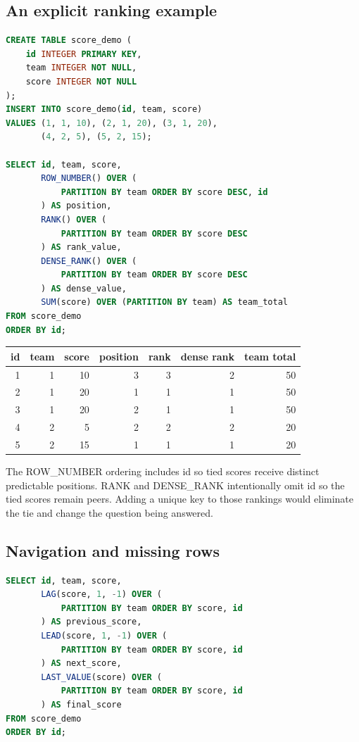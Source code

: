 \subsection{An explicit ranking example}

\begin{lstlisting}[language=SQL]
CREATE TABLE score_demo (
    id INTEGER PRIMARY KEY,
    team INTEGER NOT NULL,
    score INTEGER NOT NULL
);
INSERT INTO score_demo(id, team, score)
VALUES (1, 1, 10), (2, 1, 20), (3, 1, 20),
       (4, 2, 5), (5, 2, 15);

SELECT id, team, score,
       ROW_NUMBER() OVER (
           PARTITION BY team ORDER BY score DESC, id
       ) AS position,
       RANK() OVER (
           PARTITION BY team ORDER BY score DESC
       ) AS rank_value,
       DENSE_RANK() OVER (
           PARTITION BY team ORDER BY score DESC
       ) AS dense_value,
       SUM(score) OVER (PARTITION BY team) AS team_total
FROM score_demo
ORDER BY id;
\end{lstlisting}

\begin{longtable}{rrrrrrr}
\toprule
id & team & score & position & rank & dense rank & team total \\
\midrule
\endhead
1 & 1 & 10 & 3 & 3 & 2 & 50 \\
2 & 1 & 20 & 1 & 1 & 1 & 50 \\
3 & 1 & 20 & 2 & 1 & 1 & 50 \\
4 & 2 & 5 & 2 & 2 & 2 & 20 \\
5 & 2 & 15 & 1 & 1 & 1 & 20 \\
\bottomrule
\end{longtable}

The ROW\_NUMBER ordering includes id so tied scores receive distinct predictable positions. RANK and DENSE\_RANK intentionally omit id so the tied scores remain peers. Adding a unique key to those rankings would eliminate the tie and change the question being answered.

\subsection{Navigation and missing rows}

\begin{lstlisting}[language=SQL]
SELECT id, team, score,
       LAG(score, 1, -1) OVER (
           PARTITION BY team ORDER BY score, id
       ) AS previous_score,
       LEAD(score, 1, -1) OVER (
           PARTITION BY team ORDER BY score, id
       ) AS next_score,
       LAST_VALUE(score) OVER (
           PARTITION BY team ORDER BY score, id
       ) AS final_score
FROM score_demo
ORDER BY id;
\end{lstlisting}

